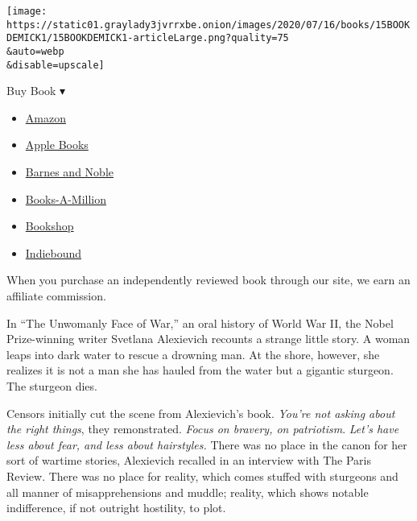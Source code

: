 \texttt{[image: https://static01.graylady3jvrrxbe.onion/images/2020/07/16/books/15BOOKDEMICK1/15BOOKDEMICK1-articleLarge.png?quality=75\\\&auto=webp\\\&disable=upscale]}

Buy Book ▾

\begin{itemize}
\tightlist
\item
  \href{https://www.amazon.com/gp/search?index=books\&tag=NYTBSREV-20\&field-keywords=Eat+the+Buddha+Barbara+Demick}{Amazon}
\item
  \href{https://du-gae-books-dot-nyt-du-prd.appspot.com/buy?title=Eat+the+Buddha\&author=Barbara+Demick}{Apple
  Books}
\item
  \href{https://www.anrdoezrs.net/click-7990613-11819508?url=https\%3A\%2F\%2Fwww.barnesandnoble.com\%2Fw\%2F\%3Fean\%3D9780812998757}{Barnes
  and Noble}
\item
  \href{https://www.anrdoezrs.net/click-7990613-35140?url=https\%3A\%2F\%2Fwww.booksamillion.com\%2Fp\%2FEat\%2Bthe\%2BBuddha\%2FBarbara\%2BDemick\%2F9780812998757}{Books-A-Million}
\item
  \href{https://bookshop.org/a/3546/9780812998757}{Bookshop}
\item
  \href{https://www.indiebound.org/book/9780812998757?aff=NYT}{Indiebound}
\end{itemize}

When you purchase an independently reviewed book through our site, we
earn an affiliate commission.

In ``The Unwomanly Face of War,'' an oral history of World War II, the
Nobel Prize-winning writer Svetlana Alexievich recounts a strange little
story. A woman leaps into dark water to rescue a drowning man. At the
shore, however, she realizes it is not a man she has hauled from the
water but a gigantic sturgeon. The sturgeon dies.

Censors initially cut the scene from Alexievich's book. \emph{You're not
asking about the right things}, they remonstrated. \emph{Focus on
bravery, on patriotism}. \emph{Let's have less about fear, and less
about hairstyles.} There was no place in the canon for her sort of
wartime stories, Alexievich recalled in an interview with The Paris
Review. There was no place for reality, which comes stuffed with
sturgeons and all manner of misapprehensions and muddle; reality, which
shows notable indifference, if not outright hostility, to plot.

